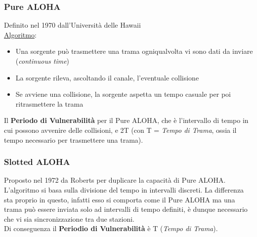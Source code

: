 \documentclass{article}
\begin{document}
            \subsubsection{Pure ALOHA}
                Definito nel 1970 dall'Università delle Hawaii \\
                \underline{Algoritmo}:
                \begin{itemize}
                    \item Una sorgente può trasmettere una trama ogniqualvolta vi sono dati da inviare (\textit{continuous time})
                    \item La sorgente rileva, ascoltando il canale, l'eventuale collisione
                    \item Se avviene una collisione, la sorgente aspetta un tempo casuale per poi ritrasmettere la trama
                \end{itemize}
                Il \textbf{Periodo di Vulnerabilità} per il Pure ALOHA, che è l'intervallo di tempo in cui possono avvenire delle collisioni, e 2T (con T = \textit{Tempo di Trama}, ossia il tempo necessario per trasmettere una trama).

            \subsubsection{Slotted ALOHA}
                Proposto nel 1972 da Roberts per duplicare la capacità di Pure ALOHA.\\
                L'algoritmo si basa sulla divisione del tempo in intervalli discreti. La differenza sta proprio in questo, infatti esso si comporta come il Pure ALOHA ma una trama può essere inviata solo ad intervalli di tempo definiti, è dunque necessario che vi sia sincronizzazione tra due stazioni.\\
                Di conseguenza il \textbf{Periodio di Vulnerabilità} è T (\textit{Tempo di Trama}).
\end{document}
